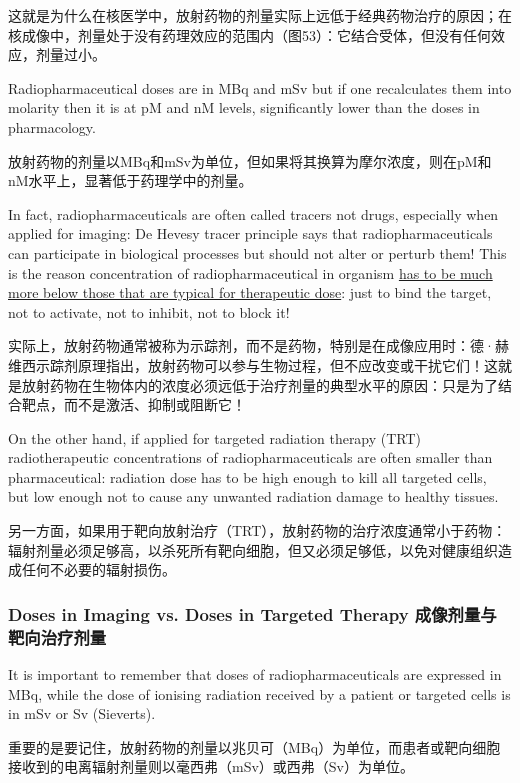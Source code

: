 \documentclass[dvipsnames, svgnames,a4paper,11pt]{article}
\begin{document}
这就是为什么在核医学中，放射药物的剂量实际上远低于经典药物治疗的原因；在核成像中，剂量处于没有药理效应的范围内（图53）：它结合受体，但没有任何效应，剂量过小。

Radiopharmaceutical doses are in MBq and mSv but if one recalculates them into molarity then it is at pM and nM levels, significantly lower than the doses in pharmacology.

放射药物的剂量以MBq和mSv为单位，但如果将其换算为摩尔浓度，则在pM和nM水平上，显著低于药理学中的剂量。

In fact, radiopharmaceuticals are often called tracers not drugs, especially when applied for imaging: De Hevesy tracer principle says that radiopharmaceuticals can participate in biological processes but should not alter or perturb them! This is the reason concentration of radiopharmaceutical in organism \underline{has to be much more below those that are typical for therapeutic dose}: just to bind the target, not to activate, not to inhibit, not to block it!

实际上，放射药物通常被称为示踪剂，而不是药物，特别是在成像应用时：德·赫维西示踪剂原理指出，放射药物可以参与生物过程，但不应改变或干扰它们！这就是放射药物在生物体内的浓度必须远低于治疗剂量的典型水平的原因：只是为了结合靶点，而不是激活、抑制或阻断它！

On the other hand, if applied for targeted radiation therapy (TRT) radiotherapeutic concentrations of radiopharmaceuticals are often smaller than pharmaceutical: radiation dose has to be high enough to kill all targeted cells, but low enough not to cause any unwanted radiation damage to healthy tissues.

另一方面，如果用于靶向放射治疗（TRT），放射药物的治疗浓度通常小于药物：辐射剂量必须足够高，以杀死所有靶向细胞，但又必须足够低，以免对健康组织造成任何不必要的辐射损伤。

\subsubsection{Doses in Imaging vs. Doses in Targeted Therapy 成像剂量与靶向治疗剂量}

It is important to remember that doses of radiopharmaceuticals are expressed in MBq, while the dose of ionising radiation received by a patient or targeted cells is in mSv or Sv (Sieverts).

重要的是要记住，放射药物的剂量以兆贝可（MBq）为单位，而患者或靶向细胞接收到的电离辐射剂量则以毫西弗（mSv）或西弗（Sv）为单位。
\end{document}
